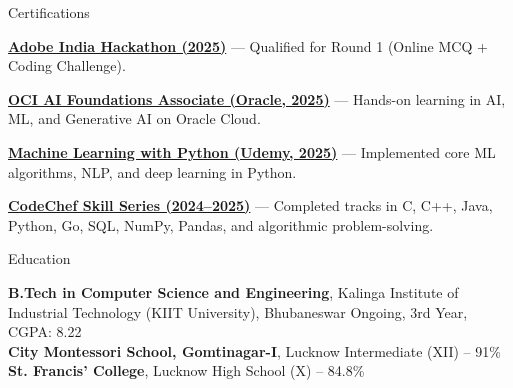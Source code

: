 \documentclass[10pt]{resume}
\begin{document}

\begin{rSection}{Certifications}

\item \textbf{\href{https://unstop.com/certificate-preview/aa08da16-c97e-4261-a363-0043d38befc9}{Adobe India Hackathon (2025)}} — Qualified for Round 1 (Online MCQ + Coding Challenge).

\item \textbf{\href{https://catalog-education.oracle.com/pls/certview/sharebadge?id=719FD170B4B05E469E06593E7B1C2D3E97A4E88D0AA2AFFF78C357C5D80D9C3A}{OCI AI Foundations Associate (Oracle, 2025)}} — Hands-on learning in AI, ML, and Generative AI on Oracle Cloud.

\item \textbf{\href{https://www.udemy.com/certificate/UC-27504e9e-2fd1-49ee-a7e5-4f3ab294f2b4}{Machine Learning with Python (Udemy, 2025)}} — Implemented core ML algorithms, NLP, and deep learning in Python.

\item \textbf{\href{https://www.codechef.com}{CodeChef Skill Series (2024–2025)}} — Completed tracks in C, C++, Java, Python, Go, SQL, NumPy, Pandas, and algorithmic problem-solving.

\end{rSection}


\begin{rSection}{Education}

{\bf B.Tech in Computer Science and Engineering}, Kalinga Institute of Industrial Technology (KIIT University), Bhubaneswar \hfill {Ongoing, 3rd Year, CGPA: 8.22}\\
{\bf City Montessori School, Gomtinagar-I}, Lucknow \hfill {Intermediate (XII) – 91\%}\\
{\bf St. Francis' College}, Lucknow \hfill {High School (X) – 84.8\%}\\

\end{rSection}
\end{document}
